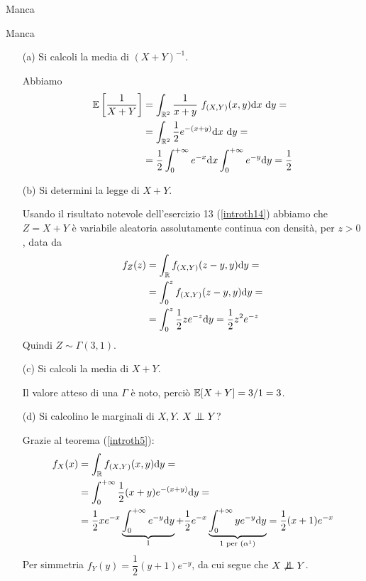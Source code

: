 \Soluzione{}
Manca

\Soluzione{}
Manca

\Soluzione{}
\begin{enumerate}
\item [(a)] Si calcoli la media di $(X+Y)^{-1}$.

Abbiamo
\begin{gather*}
\begin{aligned}
\mathbb{E}\left[ \frac{1}{X+Y} \right]&=\int_{\mathbb{R}^2}\frac{1}{x+y}\ f_{(X,Y)}(x,y) \mathrm{d} x\ \mathrm{d} y=\\
&=\int_{\mathbb{R}^2}\frac{1}{2}e^{-(x+y)}\mathrm{d} x\ \mathrm{d} y=\\
&=\frac{1}{2}\int_{0}^{+\infty} e^{-x}\mathrm{d} x\int_{0}^{+\infty} e^{-y}\mathrm{d} y=\frac{1}{2}
\end{aligned}
\end{gather*}

\item [(b)] Si determini la legge di $X+Y$.

Usando il risultato notevole dell'esercizio 13 (\ref{introth14}) abbiamo che $Z=X+Y$ è variabile aleatoria assolutamente continua con densità, per $z>0$, data da
\begin{gather*}
\begin{aligned}
f_Z(z)&=\int_{\mathbb{R}}f_{(X,Y)}(z-y,y)\mathrm{d} y=\\
&=\int_0^zf_{(X,Y)}(z-y,y)\mathrm{d} y=\\
&=\int_0^z\frac{1}{2}ze^{-z}\mathrm{d} y=\frac{1}{2}z^2e^{-z}
\end{aligned}
\end{gather*}
Quindi $Z\sim\Gamma(3,1)$.

\item [(c)] Si calcoli la media di $X+Y$.

Il valore atteso di una $\Gamma$ è noto, perciò $\mathbb{E}[X+Y]=3/1=3$.

\item [(d)] Si calcolino le marginali di $X,Y$. $X\indep Y$?

Grazie al teorema (\ref{introth5}):
\begin{gather*}
\begin{aligned}
f_X(x)&=\int_{\mathbb{R}} f_{(X,Y)}(x,y)\mathrm{d} y=\\
&=\int_{0}^{+\infty} \frac{1}{2}(x+y)e^{-(x+y)}\mathrm{d} y=\\
&=\frac{1}{2}xe^{-x}\underbrace{\int_{0}^{+\infty} e^{-y}\mathrm{d} y}_{1}+\frac{1}{2}e^{-x}\underbrace{\int_{0}^{+\infty} ye^{-y}\mathrm{d} y}_{1\text{ per }\left(\alpha^1\right)}=\frac{1}{2}(x+1)e^{-x}
\end{aligned}
\end{gather*}
Per simmetria $f_Y(y)=\dfrac{1}{2}(y+1)e^{-y}$, da cui segue che $X\not\indep Y$.


\end{enumerate}
